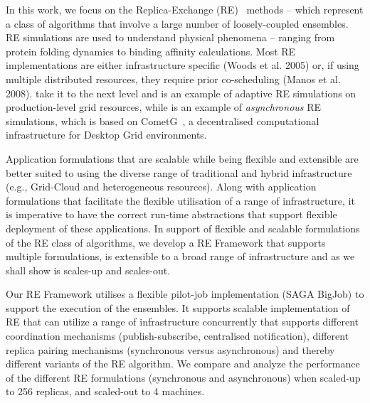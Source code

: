 \documentclass{rspublic}
\newcommand{\jhanote}[1]{ {\textcolor{red} { ***shantenu: #1 }}}
\newcommand{\jhanote}[1]{}
\begin{document}
In this work, we focus on the Replica-Exchange
(RE)~\citep{hansmann,Sugita:1999rm} methods -- which represent a class
of algorithms that involve a large number of loosely-coupled
ensembles.  RE simulations are used to understand physical phenomena
-- ranging from protein folding dynamics to binding affinity
calculations. Most RE implementations are either infrastructure
specific (Woods et al. 2005) or, if using multiple distributed
resources, they require prior co-scheduling (Manos et
al. 2008). \cite{Luckow:2008fp} take it to the next level and is an
example of adaptive RE simulations on production-level grid resources,
while \cite{parashar_arepex} is an example of \emph{asynchronous} RE
simulations, which is based on
CometG~\citep{Li:2005:CSC:1090948.1091381}, a decentralised
computational infrastructure for Desktop Grid environments.

Application formulations that are scalable while being flexible and
extensible are better suited to using the diverse range of traditional
and hybrid infrastructure (e.g., Grid-Cloud and heterogeneous
resources).  Along with application formulations that facilitate the
flexible utilisation of a range of infrastructure, it is imperative to
have the correct run-time abstractions that support flexible
deployment of these applications.  In support of flexible and scalable
formulations of the RE class of algorithms, we develop a RE Framework
that supports multiple formulations, is extensible to a broad range of
infrastructure and as we shall show is scales-up and scales-out.

Our RE Framework utilises a flexible pilot-job implementation (SAGA
BigJob) to support the execution of the ensembles.  It supports
scalable implementation of RE that can utilize a range of
infrastructure concurrently that supports different coordination
mechanisms (publish-subscribe, centralised notification), different
replica pairing mechanisms (synchronous versus asynchronous) and
thereby different variants of the RE algorithm.  We compare and
analyze the performance of the different RE formulations (synchronous
and asynchronous) when scaled-up to 256 replicas, and scaled-out to 4
machines. %
\end{document}
